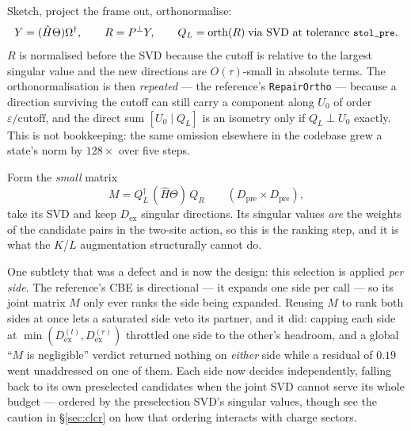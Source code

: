 \documentclass[11pt,a4paper]{article}
\newcommand{\Hb}{\hat{H}}
\newcommand{\Theb}{\Theta}
\newcommand{\Om}{\Omega}
\newcommand{\Pperp}{P^{\perp}}
\newcommand{\Dex}{D_{\mathrm{ex}}}
\newcommand{\Dpre}{D_{\mathrm{pre}}}
\newcommand{\code}[1]{\texttt{\small #1}}
\begin{document}
\begin{description}[leftmargin=1.4em,style=nextline]
\item[Stage 1 --- preselection (cheap, generous).]
Sketch, project the frame out, orthonormalise:
\begin{equation}
  Y = (\Hb\Theb)\Om^\dagger,
  \qquad
  R = \Pperp Y,
  \qquad
  Q_L = \mathrm{orth}(R) \;\text{via SVD at tolerance \code{stol\_pre}} .
\end{equation}
$R$ is normalised before the SVD because the cutoff is relative to the largest singular value
and the new directions are $O(\tau)$-small in absolute terms. The orthonormalisation is then
\emph{repeated} --- the reference's \code{RepairOrtho} --- because a direction surviving the
cutoff can still carry a component along $U_0$ of order $\varepsilon/\text{cutoff}$, and the
direct sum $[U_0 \mid Q_L]$ is an isometry only if $Q_L \perp U_0$ exactly. This is not
bookkeeping: the same omission elsewhere in the codebase grew a state's norm by $128\times$
over five steps.

\item[Stage 2 --- final selection (the ranking).]
Form the \emph{small} matrix
\begin{equation}
  M = Q_L^\dagger\,(\Hb\Theb)\,Q_R
  \qquad (\Dpre \times \Dpre),
  \label{eq:M}
\end{equation}
take its SVD and keep $\Dex$ singular directions. Its singular values \emph{are} the weights
of the candidate pairs in the two-site action, so this is the ranking step, and it is what the
$K$/$L$ augmentation structurally cannot do.
\end{description}

\noindent
One subtlety that was a defect and is now the design: this selection is applied \emph{per side}.
The reference's CBE is directional --- it expands one side per call --- so its joint matrix $M$
only ever ranks the side being expanded. Reusing $M$ to rank both sides at once lets a saturated
side veto its partner, and it did: capping each side at $\min(\Dex^{(l)}, \Dex^{(r)})$ throttled
one side to the other's headroom, and a global ``$M$ is negligible'' verdict returned nothing on
\emph{either} side while a residual of $0.19$ went unaddressed on one of them. Each side now
decides independently, falling back to its own preselected candidates when the joint SVD cannot
serve its whole budget --- ordered by the preselection SVD's singular values, though see the
caution in \S\ref{sec:clcr} on how that ordering interacts with charge sectors.
\end{document}
